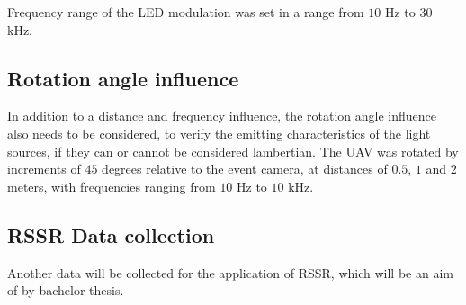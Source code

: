 Frequency range of the LED modulation was set in a range from $10$ Hz to $30$ kHz.

\subsection{Rotation angle influence}

In addition to a distance and frequency influence, the rotation angle influence also needs to be considered, to
verify the emitting characteristics of the light sources, if they can or cannot be considered lambertian.
The UAV was rotated by increments of $45$ degrees relative to the event camera, at distances of $0.5$, $1$ and $2$ meters,
with frequencies ranging from $10$ Hz to $10$ kHz. 

\subsection{RSSR Data collection}

Another data will be collected for the application of \ac{RSSR}, which will be an aim of by bachelor thesis.